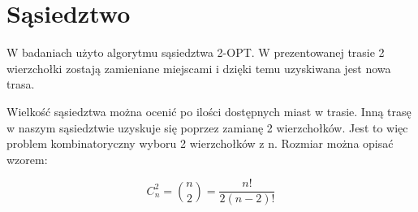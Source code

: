 \section{Sąsiedztwo}

W badaniach użyto algorytmu sąsiedztwa 2-OPT. W prezentowanej trasie 
2 wierzchołki zostają zamieniane miejscami i dzięki temu uzyskiwana jest 
nowa trasa.

Wielkość sąsiedztwa można ocenić po ilości dostępnych miast w trasie.
Inną trasę w naszym sąsiedztwie uzyskuje się poprzez zamianę 2 wierzchołków.
Jest to więc problem kombinatoryczny wyboru 2 wierzchołków z n. Rozmiar można 
opisać wzorem:

$$ C_{n}^{2} = {n\choose 2} = \frac{n!}{2(n-2)!}$$
